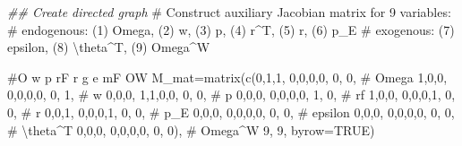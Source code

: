 \documentclass[
  letterpaper,
  DIV=11,
  numbers=noendperiod]{scrreprt}
\newenvironment{Shaded}{\begin{snugshade}}{\end{snugshade}}
\newcommand{\AttributeTok}[1]{\textcolor[rgb]{0.40,0.45,0.13}{#1}}
\newcommand{\CommentTok}[1]{\textcolor[rgb]{0.37,0.37,0.37}{#1}}
\newcommand{\ConstantTok}[1]{\textcolor[rgb]{0.56,0.35,0.01}{#1}}
\newcommand{\DecValTok}[1]{\textcolor[rgb]{0.68,0.00,0.00}{#1}}
\newcommand{\DocumentationTok}[1]{\textcolor[rgb]{0.37,0.37,0.37}{\textit{#1}}}
\newcommand{\FunctionTok}[1]{\textcolor[rgb]{0.28,0.35,0.67}{#1}}
\newcommand{\NormalTok}[1]{\textcolor[rgb]{0.00,0.23,0.31}{#1}}
\newcommand{\OtherTok}[1]{\textcolor[rgb]{0.00,0.23,0.31}{#1}}
\begin{document}
\begin{Shaded}
\begin{Highlighting}[]
\DocumentationTok{\#\# Create directed graph}
\CommentTok{\# Construct auxiliary Jacobian matrix for 9 variables: }
  \CommentTok{\# endogenous: (1) Omega, (2) w, (3) p, (4) r\^{}T, (5) r, (6) p\_E}
  \CommentTok{\# exogenous: (7) epsilon, (8) \textbackslash{}theta\^{}T, (9) Omega\^{}W}

              \CommentTok{\#O w p rF r g e mF OW}
\NormalTok{M\_mat}\OtherTok{=}\FunctionTok{matrix}\NormalTok{(}\FunctionTok{c}\NormalTok{(}\DecValTok{0}\NormalTok{,}\DecValTok{1}\NormalTok{,}\DecValTok{1}\NormalTok{, }\DecValTok{0}\NormalTok{,}\DecValTok{0}\NormalTok{,}\DecValTok{0}\NormalTok{,}\DecValTok{0}\NormalTok{, }\DecValTok{0}\NormalTok{, }\DecValTok{0}\NormalTok{,  }\CommentTok{\# Omega}
               \DecValTok{1}\NormalTok{,}\DecValTok{0}\NormalTok{,}\DecValTok{0}\NormalTok{, }\DecValTok{0}\NormalTok{,}\DecValTok{0}\NormalTok{,}\DecValTok{0}\NormalTok{,}\DecValTok{0}\NormalTok{, }\DecValTok{0}\NormalTok{, }\DecValTok{1}\NormalTok{,  }\CommentTok{\# w}
               \DecValTok{0}\NormalTok{,}\DecValTok{0}\NormalTok{,}\DecValTok{0}\NormalTok{, }\DecValTok{1}\NormalTok{,}\DecValTok{1}\NormalTok{,}\DecValTok{0}\NormalTok{,}\DecValTok{0}\NormalTok{, }\DecValTok{0}\NormalTok{, }\DecValTok{0}\NormalTok{,  }\CommentTok{\# p}
               \DecValTok{0}\NormalTok{,}\DecValTok{0}\NormalTok{,}\DecValTok{0}\NormalTok{, }\DecValTok{0}\NormalTok{,}\DecValTok{0}\NormalTok{,}\DecValTok{0}\NormalTok{,}\DecValTok{0}\NormalTok{, }\DecValTok{1}\NormalTok{, }\DecValTok{0}\NormalTok{,  }\CommentTok{\# rf}
               \DecValTok{1}\NormalTok{,}\DecValTok{0}\NormalTok{,}\DecValTok{0}\NormalTok{, }\DecValTok{0}\NormalTok{,}\DecValTok{0}\NormalTok{,}\DecValTok{0}\NormalTok{,}\DecValTok{1}\NormalTok{, }\DecValTok{0}\NormalTok{, }\DecValTok{0}\NormalTok{,  }\CommentTok{\# r}
               \DecValTok{0}\NormalTok{,}\DecValTok{0}\NormalTok{,}\DecValTok{1}\NormalTok{, }\DecValTok{0}\NormalTok{,}\DecValTok{0}\NormalTok{,}\DecValTok{0}\NormalTok{,}\DecValTok{1}\NormalTok{, }\DecValTok{0}\NormalTok{, }\DecValTok{0}\NormalTok{,  }\CommentTok{\# p\_E}
               \DecValTok{0}\NormalTok{,}\DecValTok{0}\NormalTok{,}\DecValTok{0}\NormalTok{, }\DecValTok{0}\NormalTok{,}\DecValTok{0}\NormalTok{,}\DecValTok{0}\NormalTok{,}\DecValTok{0}\NormalTok{, }\DecValTok{0}\NormalTok{, }\DecValTok{0}\NormalTok{,  }\CommentTok{\# epsilon}
               \DecValTok{0}\NormalTok{,}\DecValTok{0}\NormalTok{,}\DecValTok{0}\NormalTok{, }\DecValTok{0}\NormalTok{,}\DecValTok{0}\NormalTok{,}\DecValTok{0}\NormalTok{,}\DecValTok{0}\NormalTok{, }\DecValTok{0}\NormalTok{, }\DecValTok{0}\NormalTok{,  }\CommentTok{\# \textbackslash{}theta\^{}T}
               \DecValTok{0}\NormalTok{,}\DecValTok{0}\NormalTok{,}\DecValTok{0}\NormalTok{, }\DecValTok{0}\NormalTok{,}\DecValTok{0}\NormalTok{,}\DecValTok{0}\NormalTok{,}\DecValTok{0}\NormalTok{, }\DecValTok{0}\NormalTok{, }\DecValTok{0}\NormalTok{),  }\CommentTok{\# Omega\^{}W}
               \DecValTok{9}\NormalTok{, }\DecValTok{9}\NormalTok{, }\AttributeTok{byrow=}\ConstantTok{TRUE}\NormalTok{)}


\end{Highlighting}
\end{Shaded}
\end{document}
